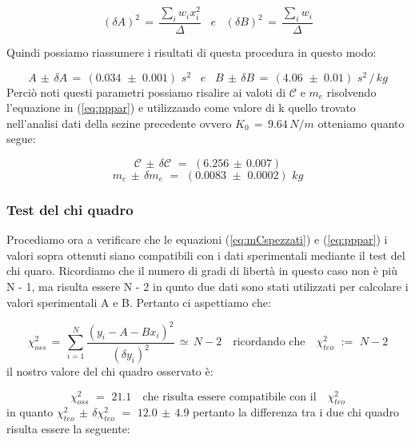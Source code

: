 \begin{itemize}
{		\begin{equation*}
			(\delta A)^2 \,=\, \frac{\sum_i w_i x_i^2}{\Delta}  \,\,\,\,\, e \,\,\,\,\,
			(\delta B)^2 \,=\, \frac{\sum_i w_i}{\Delta} 
		\end{equation*}}
\end{itemize} 
Quindi possiamo riassumere i risultati di questa procedura in questo modo:

\begin{equation*}
	A \,\pm\, \delta A \,=\, (0.034 \,\, \pm \,\, 0.001) \,\,s^2 \,\,\,\,\, e \,\,\,\,\,
	B \,\pm\, \delta B \,=\, (4.06 \,\, \pm \,\, 0.01) \,\,s^2 \,/\, kg
\end{equation*}
%
Perciò noti questi parametri possiamo risalire ai valoti di $\mathcal{C}$ e $m_e$ risolvendo l'equazione in (\ref{eq:pppar}) e utilizzando come valore di k quello trovato nell'analisi dati della sezine precedente ovvero $K_0 \,=\, 9.64 \, N/m$ otteniamo quanto segue:

\begin{equation*}
	\mathcal{C} \,\pm\, \delta \mathcal{C} \,\,=\,\, (6.256 \, \pm \, 0.007)
\end{equation*}
%
\begin{equation*}
	m_e \, \pm \, \delta m_e \,\,=\,\, (0.0083 \,\, \pm \,\, 0.0002) \,\, kg
\end{equation*}

\subsubsection{Test del chi quadro}
Procediamo ora a verificare che le equazioni (\ref{eq:mCspezzati}) e (\ref{eq:pppar}) i valori sopra ottenuti siano compatibili con i dati sperimentali mediante il test del chi quaro. Ricordiamo che il numero di gradi di libertà in questo caso non è più N - 1, ma risulta essere N - 2 in qunto due dati sono stati utilizzati per calcolare i  valori sperimentali A e B. Pertanto ci aspettiamo che:

\begin{equation*}
	\chi_{oss}^2 \,=\, \sum_{i=1}^{N} \frac{(y_i - A - Bx_i)^2}{(\delta y_i)^2} \,\simeq\, N - 2 \quad \text{ricordando che} \quad \chi_{teo}^2 \,\,:=\,\, N - 2
\end{equation*}
%
il nostro valore del chi quadro osservato è:

\begin{equation*}
	\chi_{oss}^2 \,\,=\,\, 21.1 \quad \text{che risulta essere compatibile con il} \quad \chi_{teo}^2
\end{equation*}
%
in quanto $\chi_{teo}^2 \, \pm \, \delta \chi_{teo}^2 \,\,=\,\, 12.0 \, \pm \, 4.9$ pertanto la differenza tra i due chi quadro risulta essere la seguente:

